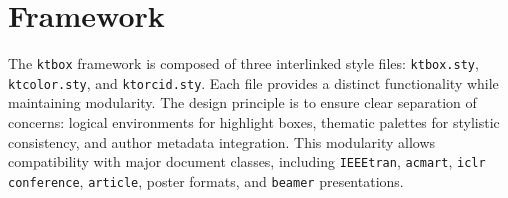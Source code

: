 \documentclass[12pt,onecolumn]{article}
\begin{document}
  \section{Framework}
  \label{sec:framework}
The \texttt{ktbox} framework is composed of three interlinked style files: \texttt{ktbox.sty}, \texttt{ktcolor.sty}, and \texttt{ktorcid.sty}. Each file provides a distinct functionality while maintaining modularity. The design principle is to ensure clear separation of concerns: logical environments for highlight boxes, thematic palettes for stylistic consistency, and author metadata integration. This modularity allows compatibility with major document classes, including \texttt{IEEEtran}, \texttt{acmart}, \texttt{iclr conference}, \texttt{article}, poster formats, and \texttt{beamer} presentations.
\end{document}
